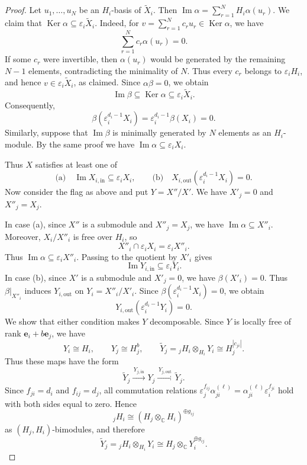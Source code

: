 \documentclass[12pt,reqno]{amsart}
\numberwithin{equation}{section}
\theoremstyle{definition}
\theoremstyle{remark}
\renewcommand{\Im}{\operatorname{Im}}
\newcommand{\Ker}{\operatorname{Ker}}
\theoremstyle{plain}
\theoremstyle{plain}
\begin{document}
\begin{proof}
Let $u_1,\ldots,u_N$ be an $H_i$-basis of $\widetilde X_i$. Then $\Im \alpha=\sum_{r=1}^N H_i \alpha(u_r)$. We claim that $\Ker \alpha \subseteq \varepsilon_i \widetilde X_i$. Indeed, for $v=\sum_{r=1}^N c_r u_r \in \Ker \alpha$, we have
\[
    \sum_{r=1}^N c_r\alpha(u_r)=0.
\]
If some $c_r$ were invertible, then $\alpha(u_r)$ would be generated by the remaining $N-1$ elements, contradicting the minimality of $N$. 
Thus every $c_r$ belongs to $\varepsilon_iH_i$, and hence $v\in\varepsilon_i\widetilde X_i$, as claimed. 
Since $\alpha\beta=0$, we obtain
\[
    \Im\beta\subseteq\Ker\alpha
    \subseteq\varepsilon_i\widetilde X_i.
\]
Consequently, 
\[
    \beta(\varepsilon_i^{d_i-1}X_i)
    =\varepsilon_i^{d_i-1}\beta(X_i)=0.
\]
Similarly, suppose that $\Im\beta$ is minimally generated by $N$ elements as an $H_i$-module. By the same proof we have $\Im\alpha\subseteq\varepsilon_i X_i$.

Thus $X$ satisfies at least one of
\[
    \text{(a)}\quad
    \Im X_{i,\mathrm{in}} \subseteq\varepsilon_iX_i,
    \qquad
    \text{(b)}\quad X_{i,\mathrm{out}} (\varepsilon_i^{d_i-1}X_i)=0.
\]
Now consider the flag as above and put $Y=X''/X'$. We have $X'_j=0$ and $X''_j=X_j$.

In case (a), since $X''$ is a submodule and $X''_j=X_j$, we have $\Im\alpha\subseteq X''_i$. Moreover, $X_i/X''_i$ is free over $H_i$, so
\[
    X''_i\cap\varepsilon_iX_i=\varepsilon_iX''_i.
\]
Thus $\Im\alpha\subseteq \varepsilon_iX''_i$. Passing to the quotient by $X'_i$ gives 
\[
    \Im Y_{i,\mathrm{in}}\subseteq\varepsilon_iY_i.
\]
In case (b), since $X'$ is a submodule and $X'_j=0$, we have $\beta(X'_i)=0$. Thus $\beta|_{X''_i}$ induces $Y_{i,\mathrm{out}}$ on $Y_i=X''_i/X'_i$. Since $\beta(\varepsilon_i^{d_i-1}X_i)=0$, we obtain
\[
    Y_{i,\mathrm{out}}(\varepsilon_i^{d_i-1}Y_i)=0.
\]
We show that either condition makes $Y$ decomposable. Since $Y$ is locally free of rank $\mathbf e_i+b\mathbf e_j$, we have
\[
    Y_i\cong H_i,\qquad Y_j\cong H_j^b,
    \qquad
    \widetilde Y_j
    ={}_jH_i\otimes_{H_i}Y_i
    \cong H_j^{|c_{ji}|}.
\]
Thus these maps have the form
\[
    \widetilde Y_j
    \xrightarrow{\,Y_{j,\mathrm{in}}\,}
    Y_j
    \xrightarrow{\,Y_{j,\mathrm{out}}\,}
    \widetilde Y_j.
\]
Since $f_{ji}=d_i$ and $f_{ij}=d_j$, all commutation relations $\varepsilon_j^{f_{ij}}\alpha_{ji}^{(\ell)}=\alpha_{ji}^{(\ell)}\varepsilon_i^{f_{ji}}$ hold with both sides equal to zero. Hence
\[
    {}_jH_i\cong
    (H_j\otimes_{\mathbb C}H_i)^{\oplus g_{ij}}
\]
as $(H_j,H_i)$-bimodules, and therefore
\[
    \widetilde Y_j
    ={}_jH_i\otimes_{H_i}Y_i
    \cong H_j\otimes_{\mathbb C}Y_i^{\oplus g_{ij}}.
\]


\end{proof}
\end{document}
